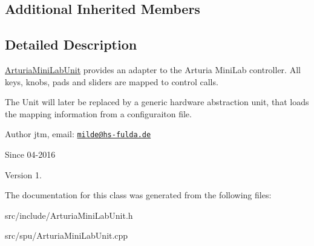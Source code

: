 \subsection*{Additional Inherited Members}


\subsection{Detailed Description}
\hyperlink{classArturiaMiniLabUnit}{Arturia\-Mini\-Lab\-Unit} provides an adapter to the Arturia Mini\-Lab controller. All keys, knobs, pads and sliders are mapped to control calls.

The Unit will later be replaced by a generic hardware abstraction unit, that loads the mapping information from a configuraiton file.

\begin{DoxyAuthor}{Author}
jtm, email\-:  \href{mailto:milde@hs-fulda.de}{\tt milde@hs-\/fulda.\-de} 
\end{DoxyAuthor}
\begin{DoxySince}{Since}
04-\/2016 
\end{DoxySince}
\begin{DoxyVersion}{Version}
1. 
\end{DoxyVersion}


The documentation for this class was generated from the following files\-:\begin{DoxyCompactItemize}
\item 
src/include/Arturia\-Mini\-Lab\-Unit.\-h\item 
src/spu/Arturia\-Mini\-Lab\-Unit.\-cpp\end{DoxyCompactItemize}

